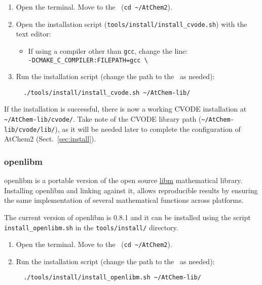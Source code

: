 \begin{enumerate}
\item Open the terminal. Move to the \maindir\ (\verb|cd ~/AtChem2|).
\item Open the installation script (\texttt{tools/install/install\_cvode.sh})
  with the text editor:
  \begin{itemize}
  \item If using a compiler other than \texttt{gcc}, change the line:\\
    \texttt{-DCMAKE\_C\_COMPILER:FILEPATH=gcc \textbackslash}
  \end{itemize}
\item Run the installation script (change the path to the \depdir\ as needed):
  \begin{verbatim}
  ./tools/install/install_cvode.sh ~/AtChem-lib/
  \end{verbatim}
\end{enumerate}

If the installation is successful, there is now a working CVODE installation
at \texttt{\textasciitilde/AtChem-lib/cvode/}. Take note of the CVODE library
path (\texttt{\textasciitilde/AtChem-lib/cvode/lib/}), as it will be
needed later to complete the configuration of AtChem2 (Sect.~\ref{sec:install}).

\subsubsection{openlibm}

openlibm is a portable version of the open source \href{https://openlibm.org}{libm}
mathematical library. Installing openlibm and linking against it,
allows reproducible results by ensuring the same implementation of
several mathematical functions across platforms.

The current version of openlibm is 0.8.1 and it can be installed using
the script \texttt{install\_openlibm.sh} in the \texttt{tools/install/}
directory.

\begin{enumerate}
\item Open the terminal. Move to the \maindir\ (\verb|cd ~/AtChem2|).
\item Run the installation script (change the path to the \depdir\ as needed):
  \begin{verbatim}
  ./tools/install/install_openlibm.sh ~/AtChem-lib/
  \end{verbatim}
\end{enumerate}

